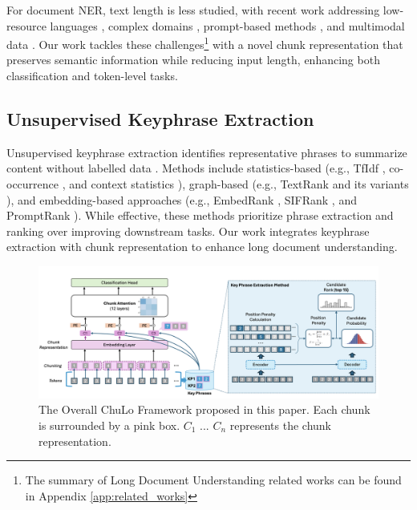\documentclass[11pt]{article}
\begin{document}
For document NER, text length is less studied, with recent work addressing low-resource languages \citep{ccetindaug2023named, mengliev2024developing}, complex domains \citep{park2023web, bhattacharya2023improving}, prompt-based methods \citep{wang2023gpt, dagdelen2024structured, hu2024improving}, and multimodal data \citep{yu2023grounded, zhang2023reducing, li-etal-2025-midas}. Our work tackles these challenges\footnote{The summary of Long Document Understanding related works can be found in Appendix \ref{app:related_works}} with a novel chunk representation that preserves semantic information while reducing input length, enhancing both classification and token-level tasks.













\subsection{Unsupervised Keyphrase Extraction}
Unsupervised keyphrase extraction identifies representative phrases to summarize content without labelled data \citep{hasan-ng-2014-automatic}. Methods include statistics-based (e.g., TfIdf \citep{el2009kp}, co-occurrence \citep{liu2009clustering}, and context statistics \citep{campos2020yake, won2019automatic}), graph-based (e.g., TextRank \citep{mihalcea2004textrank} and its variants \citep{wan2008single, bougouin2013topicrank, florescu2017positionrank, yu2018wikirank}), and embedding-based approaches (e.g., EmbedRank \citep{bennani2018simple}, SIFRank \citep{sun2020sifrank}, and PromptRank \citep{kong-etal-2023-promptrank}). While effective, these methods prioritize phrase extraction and ranking over improving downstream tasks. Our work integrates keyphrase extraction with chunk representation to enhance long document understanding.





\begin{figure}[th]
\vspace{-0.1in}

\includegraphics[width=1.0\linewidth]{images/framework_2.png}
\vspace{-0.1in}
\caption{The Overall ChuLo Framework proposed in this paper. Each chunk is surrounded by a pink box. $C_1$ ... $C_n$ represents the chunk representation.}
\label{fig:framework}
\vspace{-5mm}
\end{figure}
\end{document}
